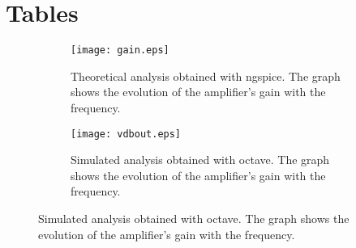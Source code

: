 \section{Tables}
\label{sec:tables}

\begin{figure}[H]
\centering
\caption{Plots from theoretical and simulation analysis}
\begin{subfigure}{\textwidth}
\centering
\texttt{[image: gain.eps]}
\caption{Theoretical analysis obtained with ngspice. The graph shows the evolution of the amplifier's gain with the frequency.}
\end{subfigure}
\begin{subfigure}{\textwidth}
\centering
\texttt{[image: vdbout.eps]}
\caption{Simulated analysis obtained with octave. The graph shows the evolution of the amplifier's gain with the frequency.}
\end{subfigure}
\end{figure}


